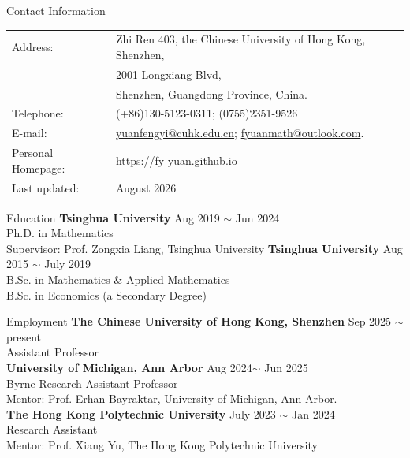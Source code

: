\documentclass[
	11pt, %
]{resume} %
\begin{document}
\begin{rSection}{Contact Information}
    	\begin{tabular}{ll}
		
		Address: & Zhi Ren 403, the Chinese University of Hong Kong, Shenzhen, \\
        &2001 Longxiang Blvd, \\
        &Shenzhen, Guangdong Province, China.\\
		Telephone: & (+86)130-5123-0311; (0755)2351-9526\\
		E-mail: & \href{yuanfengyi@cuhk.edu.cn}{yuanfengyi@cuhk.edu.cn}; \href{fyuanmath@outlook.com}{fyuanmath@outlook.com}. \\
		Personal Homepage: & \href{https://fy-yuan.github.io}{https://fy-yuan.github.io}\\
		Last updated: & August 2026\\
		
	\end{tabular}
\end{rSection}

\begin{rSection}{Education}
	\textbf{Tsinghua University} \hfill {Aug 2019 $\sim$ Jun 2024} \\ 
	Ph.D. in Mathematics \\
        Supervisor: Prof. Zongxia Liang, Tsinghua University	
 \vskip 3pt       
	\textbf{Tsinghua University} \hfill {Aug 2015 $\sim$ July 2019} \\ 
	B.Sc. in Mathematics \& Applied Mathematics \\
	B.Sc. in Economics (a Secondary Degree) \\	
\end{rSection}

\begin{rSection}{Employment}
\textbf{The Chinese University of Hong Kong, Shenzhen} \hfill{Sep 2025 $\sim$ present}\\
Assistant Professor\\
    \textbf{University of Michigan, Ann Arbor} \hfill{Aug 2024$\sim$ Jun 2025} \\
    Byrne Research Assistant Professor \\
    Mentor: Prof. Erhan Bayraktar, University of Michigan, Ann Arbor.\\
	\textbf{The Hong Kong Polytechnic University} \hfill {July 2023 $\sim$ Jan 2024} \\ 
	Research Assistant  \\
        Mentor: Prof. Xiang Yu, The Hong Kong Polytechnic University	      
\end{rSection}
\end{document}
